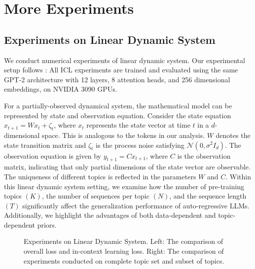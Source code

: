 \section{More Experiments}\label{exper}
\subsection{Experiments on Linear Dynamic System}\label{sec:app-linear}
We conduct numerical experiments of linear dynamic system. Our experimental setup follows \cite{li2019generalization}: All ICL experiments are trained and evaluated using the same GPT-2 architecture with 12 layers, 8 attention heads, and 256 dimensional embeddings, on NVIDIA 3090 GPUs.

For a partially-observed dynamical system, the mathematical model can be represented by state and observation equation. Consider the state equation $x_{t+1} = Wx_t + \zeta_t$, where $x_t$ represents the state vector at time $t$ in a $d$-dimensional space. This is analogous to the tokens in our analysis. $W$ denotes the state transition matrix and $\zeta_t$ is the process noise satisfying $\mathcal{N}(0, \sigma^2 I_d)$. The observation equation is given by $y_{t+1} = Cx_{t+1}$, where $C$ is the observation matrix, indicating that only partial dimensions of the state vector are observable. The uniqueness of different topics is reflected in the parameters $W$ and $C$. Within this linear dynamic system setting, we examine how the number of pre-training topics $(K)$, the number of sequences per topic $(N)$, and the sequence length $(T)$ significantly affect the generalization performance of auto-regressive LLMs. Additionally, we highlight the advantages of both data-dependent and topic-dependent priors.

\begin{figure*}[ht]
	\qquad
	\qquad
	\qquad
	\qquad
	\caption{Experiments on Linear Dynamic System. Left: The comparison of overall loss and in-context learning loss. Right: The comparison of experiments conducted on complete topic set and subset of topics.}
	\label{fig:exp-2}
\end{figure*} 

